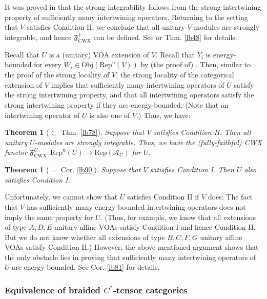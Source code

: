 \documentclass[11pt,b5paper,notitlepage]{article}
\theoremstyle{definition}
\theoremstyle{plain}
\newtheorem{thm}[df]{Theorem}
\newcommand{\fk}{\mathfrak}
\newcommand{\mc}{\mathcal}
\newcommand{\Rep}{\mathrm{Rep}}
\newcommand{\uni}{\mathrm{u}}
\newcommand{\RepV}{{\mathrm{Rep}^\uni(V)}}
\newcommand{\RepU}{\mathrm{Rep}^\uni(U)}
\newcommand{\Obj}{\mathrm{Obj}}
\newcommand{\CWX}{{\scriptscriptstyle \mathrm{CWX}}}
\numberwithin{equation}{section}
\begin{document}
It was proved in \cite{Gui19b} that the strong integrability follows from the strong intertwining property of sufficiently many intertwining operators. Returning to the setting that $V$ satisfies Condition II, we conclude that all unitary $V$-modules are strongly integrable, and hence $\fk F^V_\CWX$ can be defined. See \cite[Thm. 2.4.2]{Gui20} or Thm. \ref{lb48} for details.


Recall that $U$ is a (unitary) VOA extension of $V$. Recall that $Y_i$ is energy-bounded for every $W_i\in\Obj(\RepV)$ by (the proof of) \cite{CT23}. Then, similar to the proof of the strong locality of $V$, the strong locality of the categorical extension of $V$ implies that sufficiently many intertwining operators of $U$ satisfy the strong intertwining property, and that all intertwining operators satisfy the strong intertwining property if they are energy-bounded. (Note that an intertwining operator of $U$ is also one of $V$.) Thus, we have:

\begin{thm}[$\subset$ Thm. \ref{lb78}]\label{lb105}
Suppose that $V$ satisfies Condition II. Then all unitary $U$-modules are strongly integrable. Thus, we have the (fully-faithful) CWX functor $\fk F^U_\CWX:\RepU\rightarrow\Rep(\mc A_U)$ for $U$.
\end{thm} 



\begin{thm}[$=$ Cor. \ref{lb90}]\label{lb104}
Suppose that $V$ satisfies Condition I. Then $U$ also satisfies Condition I.
\end{thm}

Unfortunately, we cannot show that $U$ satisfies Condition II if $V$ does: The fact that $V$ has sufficiently many energy-bounded intertwining operators does not imply the same property for $U$. (Thus, for example, we know that all extensions of type $A,D,E$ unitary affine VOAs satisfy Condition I and hence Condition II. But we do not know whether all extensions of type $B,C,F,G$ unitary affine VOAs satisfy Condition II.) However, the above mentioned argument shows that the only obstacle lies in proving that sufficiently many intertwining operators of $U$ are energy-bounded. See Cor. \ref{lb81} for details.


\subsubsection{Equivalence of braided $C^*$-tensor categories}\label{lb109}
\end{document}
